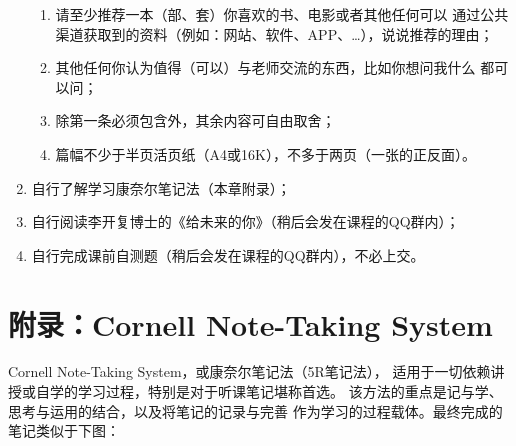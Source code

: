 \begin{ext}
\begin{enumerate}
\begin{enumerate}[(1)]
	    \item 请至少推荐一本（部、套）你喜欢的书、电影或者其他任何可以
	    通过公共渠道获取到的资料（例如：网站、软件、APP、\ldots），说说推荐的理由；
	    \item 其他任何你认为值得（可以）与老师交流的东西，比如你想问我什么
	    都可以问；
	    \item 除第一条必须包含外，其余内容可自由取舍；
	    \item 篇幅不少于半页活页纸（A4或16K），不多于两页（一张的正反面）。
	  \end{enumerate}
	  \item 自行了解学习康奈尔笔记法（本章附录）；
	  \item 自行阅读李开复博士的《给未来的你》（稍后会发在课程的QQ群内）；
	  \item 自行完成课前自测题（稍后会发在课程的QQ群内），不必上交。
	\end{enumerate}
\end{ext}

\newpage

\section*{附录：Cornell Note-Taking System}

\thispagestyle{empty}

Cornell Note-Taking System，或康奈尔笔记法（5R笔记法），
适用于一切依赖讲授或自学的学习过程，特别是对于听课笔记堪称首选。
该方法的重点是记与学、思考与运用的结合，以及将笔记的记录与完善
作为学习的过程载体。最终完成的笔记类似于下图：

